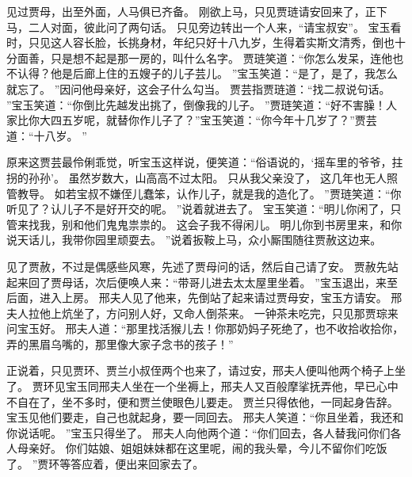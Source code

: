 见过贾母，出至外面，人马俱已齐备。
刚欲上马，只见贾琏请安回来了，正下马，二人对面，彼此问了两句话。
只见旁边转出一个人来，“请宝叔安”。
宝玉看时，只见这人容长脸，长挑身材，年纪只好十八九岁，生得着实斯文清秀，倒也十分面善，只是想不起是那一房的，叫什么名字。
贾琏笑道：“你怎么发呆，连他也不认得？他是后廊上住的五嫂子的儿子芸儿。
”宝玉笑道：“是了，是了，我怎么就忘了。
”因问他母亲好，这会子什么勾当。
贾芸指贾琏道：“找二叔说句话。
”宝玉笑道：“你倒比先越发出挑了，倒像我的儿子。
”贾琏笑道：“好不害臊！人家比你大四五岁呢，就替你作儿子了？”宝玉笑道：“你今年十几岁了？”贾芸道：“十八岁。
”\par
原来这贾芸最伶俐乖觉，听宝玉这样说，便笑道：“俗语说的，‘摇车里的爷爷，拄拐的孙孙’。
虽然岁数大，山高高不过太阳。
只从我父亲没了，
这几年也无人照管教导。
如若宝叔不嫌侄儿蠢笨，认作儿子，就是我的造化了。
”贾琏笑道：“你听见了？认儿子不是好开交的呢。
”说着就进去了。
宝玉笑道：“明儿你闲了，只管来找我，别和他们鬼鬼祟祟的。
这会子我不得闲儿。
明儿你到书房里来，和你说天话儿，我带你园里顽耍去。
”说着扳鞍上马，众小厮围随往贾赦这边来。
\par
见了贾赦，不过是偶感些风寒，先述了贾母问的话，然后自己请了安。
贾赦先站起来回了贾母话，次后便唤人来：“带哥儿进去太太屋里坐着。
”宝玉退出，来至后面，进入上房。
邢夫人见了他来，先倒站了起来请过贾母安，宝玉方请安。
邢夫人拉他上炕坐了，方问别人好，又命人倒茶来。
一钟茶未吃完，只见那贾琮来问宝玉好。
邢夫人道：“那里找活猴儿去！你那奶妈子死绝了，也不收拾收拾你，弄的黑眉乌嘴的，那里像大家子念书的孩子！”\par
正说着，只见贾环、贾兰小叔侄两个也来了，请过安，邢夫人便叫他两个椅子上坐了。
贾环见宝玉同邢夫人坐在一个坐褥上，邢夫人又百般摩挲抚弄他，早已心中不自在了，坐不多时，便和贾兰使眼色儿要走。
贾兰只得依他，一同起身告辞。
宝玉见他们要走，自己也就起身，要一同回去。
邢夫人笑道：“你且坐着，我还和你说话呢。
”宝玉只得坐了。
邢夫人向他两个道：“你们回去，各人替我问你们各人母亲好。
你们姑娘、姐姐妹妹都在这里呢，闹的我头晕，今儿不留你们吃饭了。
”贾环等答应着，便出来回家去了。
